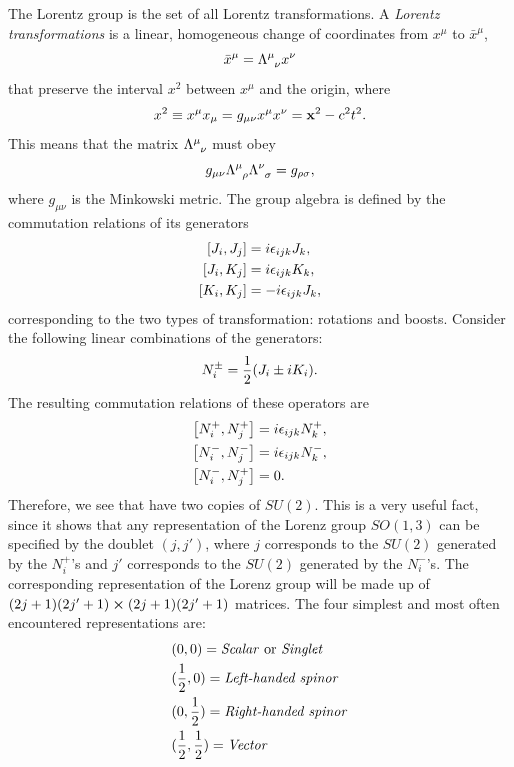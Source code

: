 The Lorentz group is the set of all Lorentz transformations. A \emph{Lorentz transformations} is a linear, homogeneous change of coordinates from $x^{\mu}$ to $\bar{x}^{\mu}$,
\begin{equation}
\bar{x}^{\mu}=\tensor{\Lambda}{^{\mu}_{\nu}}x^{\nu}
\end{equation}
that preserve the interval $x^2$ between $x^{\mu}$ and the origin, where
\begin{equation}
x^2\equiv x^{\mu} x_{\mu}=g_{\mu\nu}x^{\mu}x^{\nu}=\vb{x}^2-c^2t^2.
\end{equation}
This means that the matrix $\tensor{\Lambda}{^{\mu}_{\nu}}$ must obey
\begin{equation}
g_{\mu\nu}\tensor{\Lambda}{^{\mu}_{\rho}}\tensor{\Lambda}{^{\nu}_{\sigma}}=g_{\rho\sigma},
\end{equation}
where $g_{\mu\nu}$ is the Minkowski metric. The group algebra is defined by the commutation relations of its generators
\begin{equation}
\begin{split}
\comm{J_i}{J_j}&=i\epsilon_{ijk}J_k, \\
\comm{J_i}{K_j}&=i\epsilon_{ijk}K_k, \\
\comm{K_i}{K_j}&=-i\epsilon_{ijk}J_k, \\
\end{split}
\end{equation}
corresponding to the two types of transformation: rotations and boosts. Consider the following linear combinations of the generators:
\begin{equation}
N^{\pm}_{i}=\frac{1}{2}\qty(J_i\pm iK_i).
\end{equation}
The resulting commutation relations of these operators are
\begin{equation}
\begin{split}
\comm{N_i^+}{N_j^+}&=i\epsilon_{ijk}N_k^+, \\
\comm{N_i^-}{N_j^-}&=i\epsilon_{ijk}N_k^-, \\
\comm{N_i^-}{N_j^+}&=0. \\
\end{split}
\end{equation}
Therefore, we see that have two copies of $SU(2)$. This is a very useful fact, since it shows that any representation of the Lorenz group $SO(1,3)$ can be specified by the doublet $(j,j')$, where $j$ corresponds to the $SU(2)$ generated by the $N_i^+$'s and $j'$ corresponds to the $SU(2)$ generated by the $N_i^-$'s. The corresponding representation of the Lorenz group will be made up of $(2j+1)(2j'+1)\cross (2j+1)(2j'+1)$ matrices. The four simplest and most often encountered representations are:
\begin{equation}
\begin{split}
&(0,0)=\text{\emph{Scalar} or \emph{Singlet}}\\
&(\frac{1}{2},0)=\text{\emph{Left-handed spinor}}\\
&(0,\frac{1}{2})=\text{\emph{Right-handed spinor}}\\
&(\frac{1}{2},\frac{1}{2})=\text{\emph{Vector}}
\end{split}
\end{equation}

